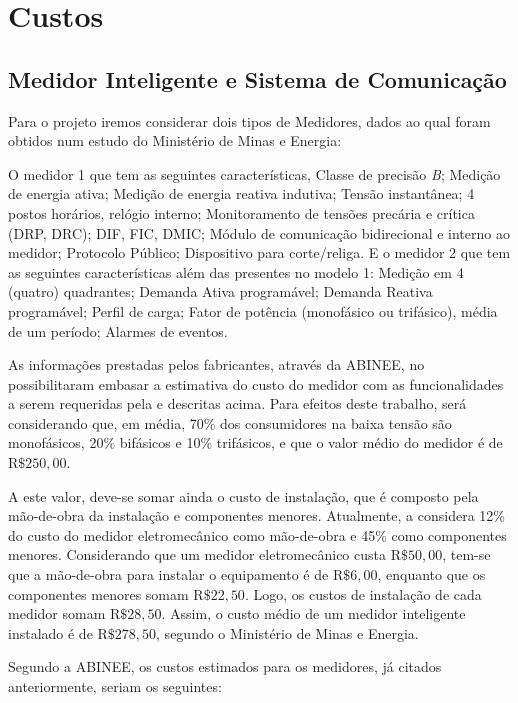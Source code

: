 \section{Custos}

\subsection{Medidor Inteligente e Sistema de Comunicação}

	Para o projeto iremos considerar dois tipos de Medidores, dados ao qual foram obtidos num estudo do Ministério de Minas e Energia:

	O medidor 1 que tem as seguintes características, Classe de precisão \textit{B}; Medição de energia ativa; Medição de energia reativa indutiva; Tensão instantânea; 4 postos horários, relógio interno; Monitoramento de tensões precária e crítica (DRP, DRC); DIF, FIC, DMIC; Módulo de comunicação bidirecional e interno ao medidor; Protocolo Público; Dispositivo para corte/religa. E o medidor 2 que tem as seguintes características além das presentes no modelo 1: Medição em 4 (quatro) quadrantes; Demanda Ativa programável; Demanda Reativa programável; Perfil de carga; Fator de potência (monofásico ou trifásico), média de um período; Alarmes de eventos.

	As informações prestadas pelos fabricantes, através da ABINEE, no possibilitaram embasar a estimativa do custo do medidor com as funcionalidades a serem requeridas pela \cite{2013Aneel} e descritas acima. Para efeitos deste trabalho, será considerando que, em média, 70\% dos consumidores na baixa tensão são monofásicos, 20\% bifásicos e 10\% trifásicos, e que o valor médio do medidor é de R$\$ 250,00$. 

	A este valor, deve-se somar ainda o custo de instalação, que é composto pela mão-de-obra da instalação e componentes menores. Atualmente, a \cite{2013Aneel} considera 12\% do custo do medidor eletromecânico como mão-de-obra e 45\% como componentes menores. Considerando que um medidor eletromecânico custa R$\$ 50,00$, tem-se que a mão-de-obra para instalar o equipamento é de R$\$ 6,00$, enquanto que os componentes menores somam R$\$ 22,50$. Logo, os custos de instalação de cada medidor somam R$\$ 28,50$. Assim, o custo médio de um medidor inteligente instalado é de R$\$ 278,50$, segundo o Ministério de Minas e Energia.

	Segundo a ABINEE, os custos estimados para os medidores, já citados anteriormente, seriam os seguintes:


